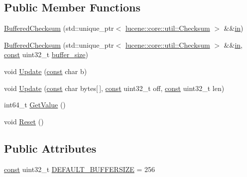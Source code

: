 \subsection*{Public Member Functions}
\begin{DoxyCompactItemize}
\item 
\mbox{\hyperlink{classlucene_1_1core_1_1store_1_1BufferedChecksum_aa8f189858ddd57d76d2c6da52131d7e4}{Buffered\+Checksum}} (std\+::unique\+\_\+ptr$<$ \mbox{\hyperlink{classlucene_1_1core_1_1util_1_1Checksum}{lucene\+::core\+::util\+::\+Checksum}} $>$ \&\&\mbox{\hyperlink{classlucene_1_1core_1_1store_1_1BufferedChecksum_a5c92d0cdf327fef20d149b87770f8b3b}{in}})
\item 
\mbox{\hyperlink{classlucene_1_1core_1_1store_1_1BufferedChecksum_ae0a951d623fe32abbacd9396bff05727}{Buffered\+Checksum}} (std\+::unique\+\_\+ptr$<$ \mbox{\hyperlink{classlucene_1_1core_1_1util_1_1Checksum}{lucene\+::core\+::util\+::\+Checksum}} $>$ \&\&\mbox{\hyperlink{classlucene_1_1core_1_1store_1_1BufferedChecksum_a5c92d0cdf327fef20d149b87770f8b3b}{in}}, \mbox{\hyperlink{ZlibCrc32_8h_a2c212835823e3c54a8ab6d95c652660e}{const}} uint32\+\_\+t \mbox{\hyperlink{classlucene_1_1core_1_1store_1_1BufferedChecksum_ad285bdb06c709d498833d692794e36e0}{buffer\+\_\+size}})
\item 
void \mbox{\hyperlink{classlucene_1_1core_1_1store_1_1BufferedChecksum_a3dae873ad624ab688910f1582a94f5a4}{Update}} (\mbox{\hyperlink{ZlibCrc32_8h_a2c212835823e3c54a8ab6d95c652660e}{const}} char b)
\item 
void \mbox{\hyperlink{classlucene_1_1core_1_1store_1_1BufferedChecksum_aca5120e922ed6723c768d899c91522f4}{Update}} (\mbox{\hyperlink{ZlibCrc32_8h_a2c212835823e3c54a8ab6d95c652660e}{const}} char bytes\mbox{[}$\,$\mbox{]}, \mbox{\hyperlink{ZlibCrc32_8h_a2c212835823e3c54a8ab6d95c652660e}{const}} uint32\+\_\+t off, \mbox{\hyperlink{ZlibCrc32_8h_a2c212835823e3c54a8ab6d95c652660e}{const}} uint32\+\_\+t len)
\item 
int64\+\_\+t \mbox{\hyperlink{classlucene_1_1core_1_1store_1_1BufferedChecksum_a8025cb018f833b7b9596fafac869fc47}{Get\+Value}} ()
\item 
void \mbox{\hyperlink{classlucene_1_1core_1_1store_1_1BufferedChecksum_adc217a01c6783a02c84f7a1a013a3d92}{Reset}} ()
\end{DoxyCompactItemize}
\subsection*{Public Attributes}
\begin{DoxyCompactItemize}
\item 
\mbox{\hyperlink{ZlibCrc32_8h_a2c212835823e3c54a8ab6d95c652660e}{const}} uint32\+\_\+t \mbox{\hyperlink{classlucene_1_1core_1_1store_1_1BufferedChecksum_ab07ac79f2ff8be2dac8f0fc485c2f74c}{D\+E\+F\+A\+U\+L\+T\+\_\+\+B\+U\+F\+F\+E\+R\+S\+I\+ZE}} = 256
\end{DoxyCompactItemize}
